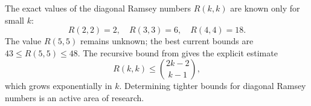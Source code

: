 \begin{remark} \label{remark:known_values_and_bounds_for_small_diagonal_ramsey_numbers}
The exact values of the diagonal Ramsey numbers $R(k,k)$ are known only for small $k$:
$$R(2,2) = 2, \quad R(3,3) = 6, \quad R(4,4) = 18.$$
The value $R(5,5)$ remains unknown; the best current bounds are $43 \leq R(5,5) \leq 48$. The recursive bound from  gives the explicit estimate
$$R(k,k) \leq \binom{2k-2}{k-1},$$
which grows exponentially in $k$. Determining tighter bounds for diagonal Ramsey numbers is an active area of research.
\end{remark}
